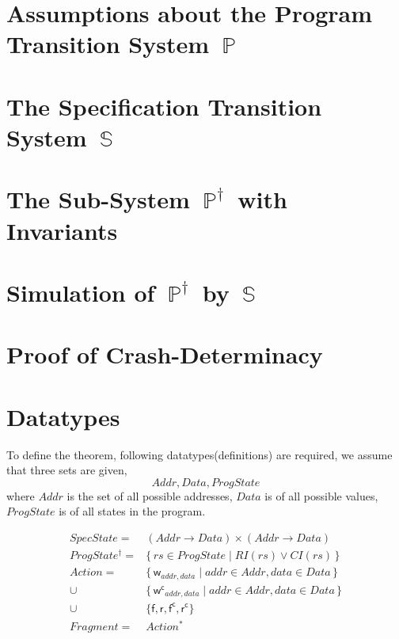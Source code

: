 \documentclass[letterpaper,twocolumn,10pt]{article}
\theoremstyle{definition}
\newcommand{\Spec}{\ensuremath{\mathbb S}}
\newcommand{\Prog}{\ensuremath{\mathbb P}}
\newcommand{\ProgInv}{\ensuremath{\mathbb P^\dagger}}
\begin{document}
\section{Assumptions about the Program Transition System~\Prog}
\label{sec:Prog}

\section{The Specification Transition System~\Spec}
\label{sec:Spec}

\section{The Sub-System~\ProgInv\ with Invariants}
\label{sec:ProgInv}

\section{Simulation of~\ProgInv\ by~\Spec}
\label{sec:sim}

\section{Proof of Crash-Determinacy}
\label{sec:proof}

\section{Datatypes}

To define the theorem, following datatypes(definitions) are required,
we assume that three sets are given,  
$$\mathit{Addr}, \mathit{Data}, \mathit{ProgState}$$
where $\mathit{Addr}$ is the set of all possible addresses, $\mathit{Data}$ is of all possible values, $\mathit{ProgState}$ is of all states in the program.

\begin{align*}
	\mathit{SpecState} ={} &(Addr \to Data) \times (Addr \to Data)\\
	\mathit{ProgState^{\dagger}} ={} &\{\, \mathit{rs} \in \mathit{ProgState} \mid \mathit{RI(rs) \lor CI(rs)} \,\}\\
	\mathit{Action} ={} &\{\,\mathsf w_{addr, data} \mid addr \in Addr, data \in Data \,\} \\
	\cup \ &\{\, \mathsf {w^c}_{addr, data} \mid addr \in Addr, data \in Data \,\}\\
	\cup \ &\{ \mathsf f,\mathsf r,\mathsf {f^c},\mathsf {r^c}\}\\
	\mathit{Fragment} ={} &\mathit{Action^*}\\
\end{align*}
\end{document}
